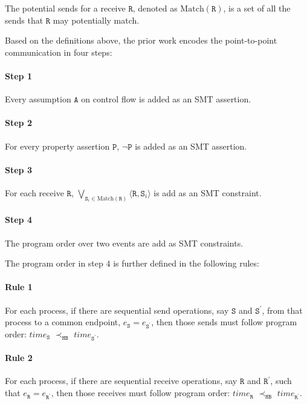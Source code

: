 \begin{definition}\label{def:potential}
The potential sends for a receive $\mathtt{R}$, denoted as $\mathrm{Match}(\mathtt{R})$, is a set of all the sends that $\mathtt{R}$ may potentially match.
\end{definition}

Based on the definitions above, the prior work encodes the point-to-point communication in four steps: 

\paragraph*{Step 1} Every assumption $\mathtt{A}$ on control flow is added as an SMT assertion.
\paragraph*{Step 2} For every property assertion $\mathtt{P}$, $\neg \mathtt{P}$ is added as an SMT assertion.
\paragraph*{Step 3} For each receive $\mathtt{R}$, $\bigvee_{\mathtt{S}_i \in \mathrm{Match}(\mathtt{R})} \langle\mathtt{R},\mathtt{S}_i\rangle$ is add as an SMT constraint. 
\paragraph*{Step 4} The program order over two events are add as SMT constraints. 

The program order in step $4$ is further defined in the following rules: 

\paragraph*{Rule 1} For each process, if there are sequential send
operations, say $\mathtt{S}$ and $\mathtt{S^\prime}$, from that process 
to a common endpoint, $e_\mathtt{S} = e_\mathtt{S^\prime}$, then those
sends must follow program order: $\mathit{time}_\mathtt{S}$
$\prec_\mathtt{HB}$ $\mathit{time}_\mathtt{S^\prime}$.

\paragraph*{Rule 2} For each process, if there are sequential receive
operations, say $\mathtt{R}$ and $\mathtt{R^\prime}$, such that $e_\mathtt{R} = e_\mathtt{R^\prime}$, then those
receives must follow program order: $\mathit{time}_\mathtt{R}$
$\prec_\mathtt{HB}$ $\mathit{time}_\mathtt{R^\prime}$.

